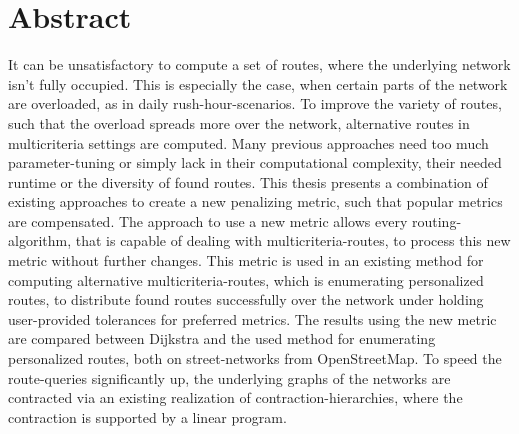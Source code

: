 \section*{Abstract}

It can be unsatisfactory to compute a set of routes, where the underlying network isn't fully occupied.
This is especially the case, when certain parts of the network are overloaded, as in daily rush-hour-scenarios.
To improve the variety of routes, such that the overload spreads more over the network, alternative routes in multicriteria settings are computed.
Many previous approaches need too much parameter-tuning or simply lack in their computational complexity, their needed runtime or the diversity of found routes.
This thesis presents a combination of existing approaches to create a new penalizing metric, such that popular metrics are compensated.
The approach to use a new metric allows every routing-algorithm, that is capable of dealing with multicriteria-routes, to process this new metric without further changes.
This metric is used in an existing method for computing alternative multicriteria-routes, which is enumerating personalized routes, to distribute found routes successfully over the network under holding user-provided tolerances for preferred metrics.
The results using the new metric are compared between Dijkstra and the used method for enumerating personalized routes, both on street-networks from OpenStreetMap.
To speed the route-queries significantly up, the underlying graphs of the networks are contracted via an existing realization of contraction-hierarchies, where the contraction is supported by a linear program.